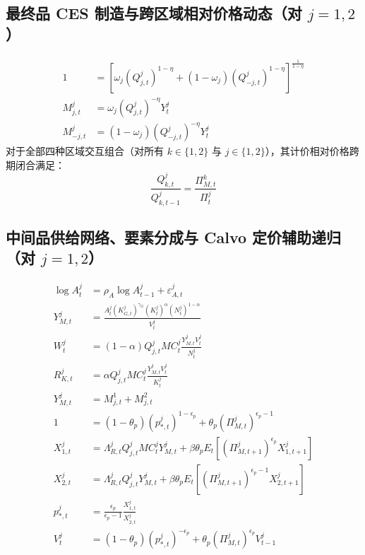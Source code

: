 \documentclass[12pt,UTF8]{ctexart}
\begin{document}
	\subsection{最终品 CES 制造与跨区域相对价格动态（对 $j=1,2$）}
	\begin{align}
		1 &=\left[ \omega_j(Q_{j,t}^j)^{1-\eta} +(1-\omega_j)(Q_{-j,t}^j)^{1-\eta} \right]^{\frac{1}{1-\eta}} \label{a13}\\
		M_{j,t}^j &=\omega_j(Q_{j,t}^j)^{-\eta}Y_t^j \label{a14}\\
		M_{-j,t}^j &=(1-\omega_j)(Q_{-j,t}^j)^{-\eta}Y_t^j \label{a15}
	\end{align}
	对于全部四种区域交互组合（对所有 $k \in \{1,2\}$ 与 $j \in \{1,2\}$），其计价相对价格跨期闭合满足：
	\begin{equation}
		\frac{Q_{k,t}^j}{Q_{k,t-1}^j}=\frac{\Pi_{M,t}^k}{\Pi_t^j} \label{a16}
	\end{equation}
	
	\subsection{中间品供给网络、要素分成与 Calvo 定价辅助递归（对 $j=1,2$）}
	\begin{align}
		\log A_t^j &=\rho_A\log A_{t-1}^j+\varepsilon_{A,t}^j \label{a17}\\
		Y_{M,t}^j &=\frac{A_t^j(K_{G,t}^j)^{\gamma_G}(K_t^j)^{\alpha}(N_t^j)^{1-\alpha}}{V_t^j} \label{a18}\\
		W_t^j &=(1-\alpha)Q_{j,t}^jMC_t^j\frac{Y_{M,t}^jV_t^j}{N_t^j} \label{a19}\\
		R_{K,t}^j &=\alpha Q_{j,t}^jMC_t^j\frac{Y_{M,t}^jV_t^j}{K_t^j} \label{a20}\\
		Y_{M,t}^j &=M_{j,t}^1+M_{j,t}^2 \label{a21}\\
		1 &=(1-\theta_p)(p_{*,t}^j)^{1-\epsilon_p}+\theta_p(\Pi_{M,t}^j)^{\epsilon_p-1} \label{a22}\\
		X_{1,t}^j &=\Lambda_{R,t}^jQ_{j,t}^jMC_t^jY_{M,t}^j +\beta\theta_pE_t\left[(\Pi_{M,t+1}^j)^{\epsilon_p}X_{1,t+1}^j\right] \label{a23}\\
		X_{2,t}^j &=\Lambda_{R,t}^jQ_{j,t}^jY_{M,t}^j +\beta\theta_pE_t\left[(\Pi_{M,t+1}^j)^{\epsilon_p-1}X_{2,t+1}^j\right] \label{a24}\\
		p_{*,t}^j &=\frac{\epsilon_p}{\epsilon_p-1}\frac{X_{1,t}^j}{X_{2,t}^j} \label{a25}\\
		V_t^j &=(1-\theta_p)(p_{*,t}^j)^{-\epsilon_p}+\theta_p(\Pi_{M,t}^j)^{\epsilon_p}V_{t-1}^j \label{a26}
	\end{align}
	
\end{document}
